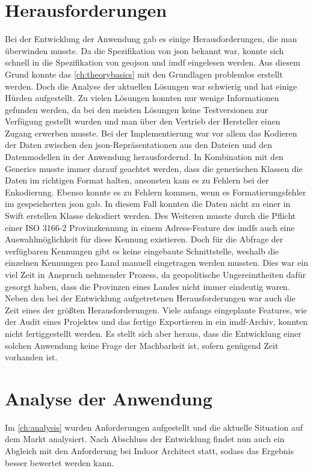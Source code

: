 \section{Herausforderungen}
Bei der Entwicklung der Anwendung gab es einige Herausforderungen, die man überwinden musste.
Da die Spezifikation von \ac{json} bekannt war, konnte sich schnell in die Spezifikation von \ac{geojson} und \ac{imdf} eingelesen werden.
Aus diesem Grund konnte das \autoref{ch:theorybasics} mit den Grundlagen problemlos erstellt werden.
Doch die Analyse der aktuellen Lösungen war schwierig und hat einige Hürden aufgestellt.
Zu vielen Lösungen konnten nur wenige Informationen gefunden werden, da bei den meisten Lösungen keine Testversionen zur Verfügung gestellt wurden und man über den Vertrieb der Hersteller einen Zugang erwerben musste.\pbreak%
%
Bei der Implementierung war vor allem das Kodieren der Daten zwischen den \ac{json}-Repräsentationen aus den Dateien und den Datenmodellen in der Anwendung herausfordernd.
In Kombination mit den Generics musste immer darauf geachtet werden, dass die generischen Klassen die Daten im richtigen Format halten, ansonsten kam es zu Fehlern bei der Enkodierung.
Ebenso konnte es zu Fehlern kommen, wenn es Formatierungsfehler im gespeicherten \ac{json} gab.
In diesem Fall konnten die Daten nicht zu einer in Swift erstellen Klasse dekodiert werden.
Des Weiteren musste durch die Pflicht einer ISO 3166-2 Provinzkennung in einem Adress-Feature des \acl{imdf}s auch eine Auswahlmöglichkeit für diese Kennung existieren.
Doch für die Abfrage der verfügbaren Kennungen gibt es keine eingebaute Schnittstelle, weshalb die einzelnen Kennungen pro Land manuell eingetragen werden mussten.
Dies war ein viel Zeit in Anspruch nehmender Prozess, da geopolitische Ungereimtheiten dafür gesorgt haben, dass die Provinzen eines Landes nicht immer eindeutig waren.\pbreak%
%
Neben den bei der Entwicklung aufgetretenen Herausforderungen war auch die Zeit eines der größten Herausforderungen.
Viele anfangs eingeplante Features, wie der Audit eines Projektes und das fertige Exportieren in ein \ac{imdf}-Archiv, konnten nicht fertiggestellt werden.
Es stellt sich aber heraus, dass die Entwicklung einer solchen Anwendung keine Frage der Machbarkeit ist, sofern genügend Zeit vorhanden ist.

\section{Analyse der Anwendung}
Im \autoref{ch:analysis} wurden Anforderungen aufgestellt und die aktuelle Situation auf dem Markt analysiert.
Nach Abschluss der Entwicklung findet nun auch ein Abgleich mit den Anforderung bei Indoor Architect statt, sodass das Ergebnis besser bewertet werden kann.

